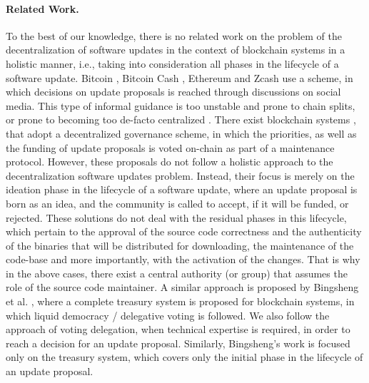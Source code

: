 \paragraph{Related Work.}
To the best of our knowledge, there is no related work on the problem of the decentralization of software updates in the context of blockchain systems in a holistic manner, i.e., taking into consideration all phases in the lifecycle of a software update. 
Bitcoin \cite{bitcoin}, Bitcoin Cash , Ethereum \cite{ethereum} and Zcash  use a  scheme, in which decisions on update proposals is reached through discussions on social media. This type of informal guidance is  too unstable and prone to chain splits, or prone to becoming too de-facto centralized \cite{buterin_on_gov}. There exist blockchain systems \cite{dash}, \cite{decred} that adopt a decentralized governance scheme, in which the priorities, as well as the funding of update proposals is voted on-chain as part of a maintenance protocol. However, these proposals do not follow a holistic approach to the decentralization software updates problem. Instead, their focus is merely on the ideation phase in the lifecycle of a software update, where an update proposal is born as an idea, and the community is called to accept, if it will be funded, or rejected. These solutions do not deal with the residual phases in this lifecycle, which pertain to the approval of the source code correctness and the authenticity of the binaries that will be distributed for downloading, the maintenance of the code-base and more importantly, with the activation of the changes. That is why in the above cases, there exist a central authority (or group) that assumes the role of the source code maintainer. A similar approach is proposed by Bingsheng et al. \cite{cryptoeprint:2018:435}, where a complete treasury system is proposed for blockchain systems, in which liquid democracy / delegative voting is followed. We also follow the approach of voting delegation, when technical expertise is required, in order to reach a decision for an update proposal. Similarly, Bingsheng's work is focused only on the treasury system, which covers only the initial phase in the lifecycle of an update proposal.


%
